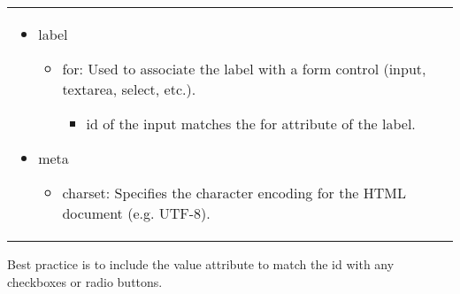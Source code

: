 \begin{summary}
\begin{center}
\begin{tabular}{ll}
{\begin{itemize}
\begin{itemize}
\begin{itemize}
                    \end{itemize}
                    \item label
                    \begin{itemize}
                        \item for: Used to associate the label with a form control (input, textarea, select, etc.).
                        \begin{itemize}
                            \item id of the input matches the for attribute of the label.
                        \end{itemize}
                    \end{itemize}
                    \item meta
                    \begin{itemize}
                        \item charset: Specifies the character encoding for the HTML document (e.g. UTF-8).
                    \end{itemize}
                \end{itemize}
            \end{itemize}} \\
        \end{tabular}
    \end{center}
\end{summary}

\begin{warning}
Best practice  is to include the value attribute to match the id with any checkboxes or radio buttons.
\end{warning}


